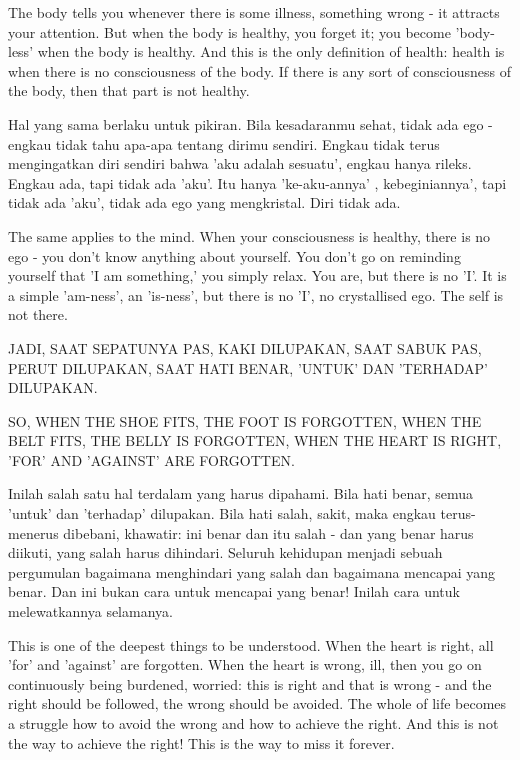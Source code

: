 \english
The body tells you whenever there is some illness, something wrong - it attracts your attention. But when the body is healthy, you forget it; you become 'body-less' when the body is healthy. And this is the only definition of health: health is when there is no consciousness of the body. If there is any sort of consciousness of the body, then that part is not healthy.

\bahasa
Hal yang sama berlaku untuk pikiran. Bila kesadaranmu sehat, tidak ada ego - engkau tidak tahu apa-apa tentang dirimu sendiri. Engkau tidak terus mengingatkan diri sendiri bahwa 'aku adalah sesuatu', engkau hanya rileks. Engkau ada, tapi tidak ada 'aku'. Itu hanya 'ke-aku-annya' , kebeginiannya', tapi tidak ada 'aku', tidak ada ego yang mengkristal. Diri tidak ada.

\english
The same applies to the mind. When your consciousness is healthy, there is no ego - you don't know anything about yourself. You don't go on reminding yourself that 'I am something,' you simply relax. You are, but there is no 'I'. It is a simple 'am-ness', an 'is-ness', but there is no 'I', no crystallised ego. The self is not there.

\bahasa
JADI, SAAT SEPATUNYA PAS, KAKI DILUPAKAN, SAAT SABUK PAS, PERUT DILUPAKAN, SAAT HATI BENAR, 'UNTUK' DAN 'TERHADAP' DILUPAKAN.

\english
SO, WHEN THE SHOE FITS, THE FOOT IS FORGOTTEN, WHEN THE BELT FITS, THE BELLY IS FORGOTTEN, WHEN THE HEART IS RIGHT, 'FOR' AND 'AGAINST' ARE FORGOTTEN.

\bahasa
Inilah salah satu hal terdalam yang harus dipahami. Bila hati benar, semua 'untuk' dan 'terhadap' dilupakan. Bila hati salah, sakit, maka engkau terus-menerus dibebani, khawatir: ini benar dan itu salah - dan yang benar harus diikuti, yang salah harus dihindari. Seluruh kehidupan menjadi sebuah pergumulan bagaimana menghindari yang salah dan bagaimana mencapai yang benar. Dan ini bukan cara untuk mencapai yang benar! Inilah cara untuk melewatkannya selamanya.

\english
This is one of the deepest things to be understood. When the heart is right, all 'for' and 'against' are forgotten. When the heart is wrong, ill, then you go on continuously being burdened, worried: this is right and that is wrong - and the right should be followed, the wrong should be avoided. The whole of life becomes a struggle how to avoid the wrong and how to achieve the right. And this is not the way to achieve the right! This is the way to miss it forever.

